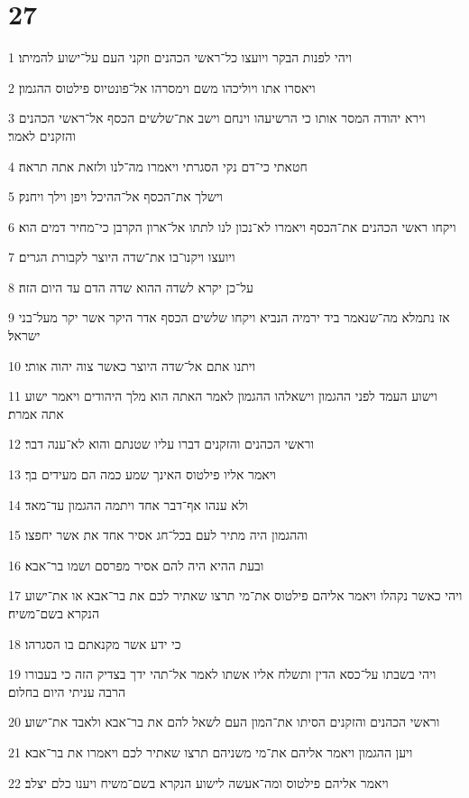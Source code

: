 \chapter{27}

\par 1 ויהי לפנות הבקר ויועצו כל־ראשי הכהנים וזקני העם על־ישוע להמיתו׃
\par 2 ויאסרו אתו ויוליכהו משם וימסרהו אל־פונטיוס פילטוס ההגמון׃
\par 3 וירא יהודה המסר אותו כי הרשיעהו וינחם וישב את־שלשים הכסף אל־ראשי הכהנים והזקנים לאמר׃
\par 4 חטאתי כי־דם נקי הסגרתי ויאמרו מה־לנו ולזאת אתה תראה׃
\par 5 וישלך את־הכסף אל־ההיכל ויפן וילך ויחנק׃
\par 6 ויקחו ראשי הכהנים את־הכסף ויאמרו לא־נכון לנו לתתו אל־ארון הקרבן כי־מחיר דמים הוא׃
\par 7 ויועצו ויקנו־בו את־שדה היוצר לקבורת הגרים׃
\par 8 על־כן יקרא לשדה ההוא שדה הדם עד היום הזה׃
\par 9 אז נתמלא מה־שנאמר ביד ירמיה הנביא ויקחו שלשים הכסף אדר היקר אשר יקר מעל־בני ישראל׃
\par 10 ויתנו אתם אל־שדה היוצר כאשר צוה יהוה אותי׃
\par 11 וישוע העמד לפני ההגמון וישאלהו ההגמון לאמר האתה הוא מלך היהודים ויאמר ישוע אתה אמרת׃
\par 12 וראשי הכהנים והזקנים דברו עליו שטנתם והוא לא־ענה דבר׃
\par 13 ויאמר אליו פילטוס האינך שמע כמה הם מעידים בך׃
\par 14 ולא ענהו אף־דבר אחד ויתמה ההגמון עד־מאד׃
\par 15 וההגמון היה מתיר לעם בכל־חג אסיר אחד את אשר יחפצו׃
\par 16 ובעת ההיא היה להם אסיר מפרסם ושמו בר־אבא׃
\par 17 ויהי כאשר נקהלו ויאמר אליהם פילטוס את־מי תרצו שאתיר לכם את בר־אבא או את־ישוע הנקרא בשם־משיח׃
\par 18 כי ידע אשר מקנאתם בו הסגרהו׃
\par 19 ויהי בשבתו על־כסא הדין ותשלח אליו אשתו לאמר אל־תהי ידך בצדיק הזה כי בעבורו הרבה עניתי היום בחלום׃
\par 20 וראשי הכהנים והזקנים הסיתו את־המון העם לשאל להם את בר־אבא ולאבד את־ישוע׃
\par 21 ויען ההגמון ויאמר אליהם את־מי משניהם תרצו שאתיר לכם ויאמרו את בר־אבא׃
\par 22 ויאמר אליהם פילטוס ומה־אעשה לישוע הנקרא בשם־משיח ויענו כלם יצלב׃
